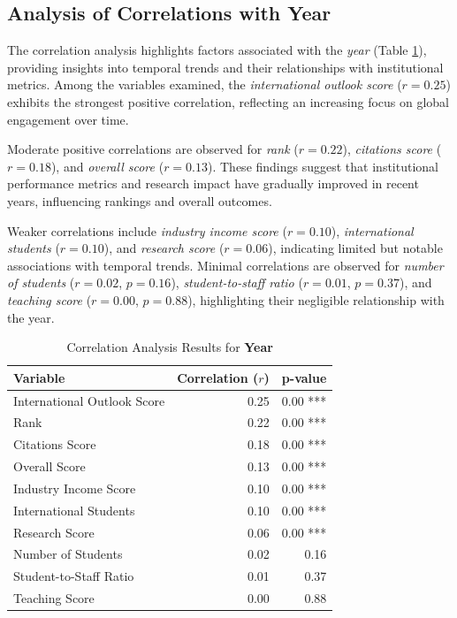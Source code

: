 \documentclass[conference]{IEEEtran}
\begin{document}
\subsection{Analysis of Correlations with Year}

The correlation analysis highlights factors associated with the \textit{year} (Table \ref{tab:correlation_year}), providing insights into temporal trends and their relationships with institutional metrics. Among the variables examined, the \textit{international outlook score} ($r = 0.25$) exhibits the strongest positive correlation, reflecting an increasing focus on global engagement over time.

Moderate positive correlations are observed for \textit{rank} ($r = 0.22$), \textit{citations score} ($r = 0.18$), and \textit{overall score} ($r = 0.13$). These findings suggest that institutional performance metrics and research impact have gradually improved in recent years, influencing rankings and overall outcomes.

Weaker correlations include \textit{industry income score} ($r = 0.10$), \textit{international students} ($r = 0.10$), and \textit{research score} ($r = 0.06$), indicating limited but notable associations with temporal trends. Minimal correlations are observed for \textit{number of students} ($r = 0.02$, $p = 0.16$), \textit{student-to-staff ratio} ($r = 0.01$, $p = 0.37$), and \textit{teaching score} ($r = 0.00$, $p = 0.88$), highlighting their negligible relationship with the year.

\begin{table}[h!]
	\centering
	\caption{Correlation Analysis Results for \textbf{Year}}
	\label{tab:correlation_year}
	\begin{tabular}{|l|r|r|}
		\hline
		\textbf{Variable} & \textbf{Correlation ($r$)} & \textbf{p-value} \\
		\hline
		International Outlook Score & 0.25 & 0.00 *** \\
		Rank & 0.22 & 0.00 *** \\
		Citations Score & 0.18 & 0.00 *** \\
		Overall Score & 0.13 & 0.00 *** \\
		Industry Income Score & 0.10 & 0.00 *** \\
		International Students & 0.10 & 0.00 *** \\
		Research Score & 0.06 & 0.00 *** \\
		Number of Students & 0.02 & 0.16 \\
		Student-to-Staff Ratio & 0.01 & 0.37 \\
		Teaching Score & 0.00 & 0.88 \\
		\hline
	\end{tabular}
\end{table}
\end{document}
